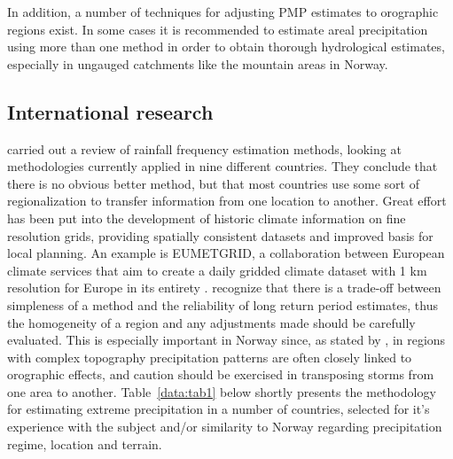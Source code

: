 \documentclass[12pt,a4paper,english]{article}
\begin{document}
\noindent In addition, a number of techniques for adjusting PMP estimates to orographic regions exist. In some cases it is recommended to estimate areal precipitation using more than one method in order to obtain thorough hydrological estimates, especially in ungauged catchments like the mountain areas in Norway.  

\subsection{International research}

\noindent \cite{SvenssonandJones2010a} carried out a review of rainfall frequency estimation methods, looking at methodologies currently applied in nine different countries. They conclude that there is no obvious better method, but that most countries use some sort of regionalization to transfer information from one location to another. Great effort has been put into the development of historic climate information on fine resolution grids, providing spatially consistent datasets and improved basis for local planning. An example is EUMETGRID, a collaboration between European climate services that aim to create a daily gridded climate dataset with 1 km resolution for Europe in its entirety \citep[http://eumetgrid.met.no]{TveitoandFrei2011}. 
\cite{SvenssonandJones2010a} recognize that there is a trade-off between simpleness of a method and the reliability of long return period estimates, thus the homogeneity of a region and any adjustments made should be carefully evaluated. This is especially important in Norway since, as stated by \cite{WMO2009a}, in regions with complex topography precipitation patterns are often closely linked to orographic effects, and caution should be exercised in transposing storms from one area to another. 
Table~\ref{data:tab1} below shortly presents the methodology for estimating extreme precipitation in a number of countries, selected for it's experience with the subject and/or similarity to Norway regarding precipitation regime, location and terrain. 

\clearpage
\newpage 
\end{document}
